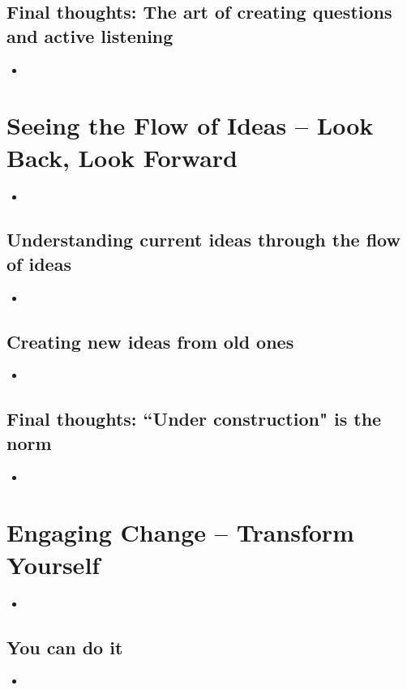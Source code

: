 \documentclass[11pt]{article}
\begin{document}
\subsection{Final thoughts: The art of creating questions and active listening}
\begin{itemize}
\item
\end{itemize}

\section{Seeing the Flow of Ideas -- Look Back, Look Forward}
\begin{itemize}
\item
\end{itemize}

\subsection{Understanding current ideas through the flow of ideas}
\begin{itemize}
\item
\end{itemize}

\subsection{Creating new ideas from old ones}
\begin{itemize}
\item
\end{itemize}

\subsection{Final thoughts: ``Under construction" is the norm}
\begin{itemize}
\item
\end{itemize}

\section{Engaging Change -- Transform Yourself}
\begin{itemize}
\item
\end{itemize}

\subsection{You can do it}
\begin{itemize}
\item
\end{itemize}
\end{document}
